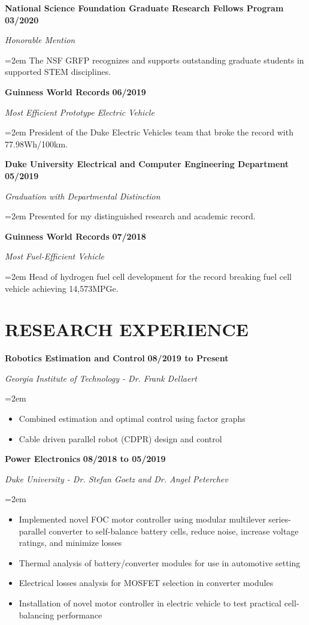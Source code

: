 \documentclass[paper=letter,fontsize=11pt]{scrartcl} %
\newcommand{\sepspace}{\vspace*{0em}}		%
\newcommand{\NewPart}[2]{\section*{\uppercase{#1} #2}}
\newcommand{\EducationEntry}[4]{
		\noindent \textbf{#1} \hfill      %
		\colorbox{White}{%
			\bf 
			\parbox{10em}{%
			\hfill\color{Black}#2}} \par  %
		\noindent \textit{#3} \par        %
		\noindent\hangindent=2em\hangafter=0 \small #4 %
		\normalsize \par}
\newcommand{\AwardEntry}[4]{
	\noindent \textbf{#1} \hfill      %
	\colorbox{White}{%
		\bf 
		\hfill\color{Black}#2} \par  %
	\noindent \textit{#3} \par        %
	\noindent\hangindent=2em\hangafter=0 \small #4 %
	\normalsize \par}
\newcommand{\WorkEntry}[4]{				  %
		\noindent \textbf{#1} \hfill      %
		\colorbox{White}{\bf \color{Black}#2} \par  %
		\noindent \textit{#3} \par              %
		\noindent\hangindent=2em\hangafter=0 \small #4 %
		\normalsize \par}
\begin{document}
\AwardEntry{National Science Foundation Graduate Research Fellows Program}{03/2020}
	{Honorable Mention}
	{The NSF GRFP recognizes and supports outstanding graduate students in supported STEM disciplines.}
\AwardEntry{Guinness World Records}{06/2019}
	{Most Efficient Prototype Electric Vehicle}
	{President of the Duke Electric Vehicles team that broke the record with 77.98Wh/100km.}
\AwardEntry{Duke University Electrical and Computer Engineering Department}{05/2019}
	{Graduation with Departmental Distinction}
	{Presented for my distinguished research and academic record.}
\AwardEntry{Guinness World Records}{07/2018}
	{Most Fuel-Efficient Vehicle}
	{Head of hydrogen fuel cell development for the record breaking fuel cell vehicle achieving 14,573MPGe.}

\NewPart{Research Experience}{}

\WorkEntry{Robotics Estimation and Control}{08/2019 to Present}{Georgia Institute of Technology - Dr. Frank Dellaert}{
	\begin{itemize}
		\item Combined estimation and optimal control using factor graphs
		\item Cable driven parallel robot (CDPR) design and control
	\end{itemize}
}
\sepspace

\WorkEntry{Power Electronics}{08/2018 to 05/2019}{Duke University - Dr. Stefan Goetz and Dr. Angel Peterchev}{
	\begin{itemize}
		\item Implemented novel FOC motor controller using modular multilever series-parallel converter to self-balance battery cells, reduce noise, increase voltage ratings, and minimize losses
		\item Thermal analysis of battery/converter modules for use in automotive setting
		\item Electrical losses analysis for MOSFET selection in converter modules
		\item Installation of novel motor controller in electric vehicle to test practical cell-balancing performance
	\end{itemize}
}
\sepspace
\end{document}

